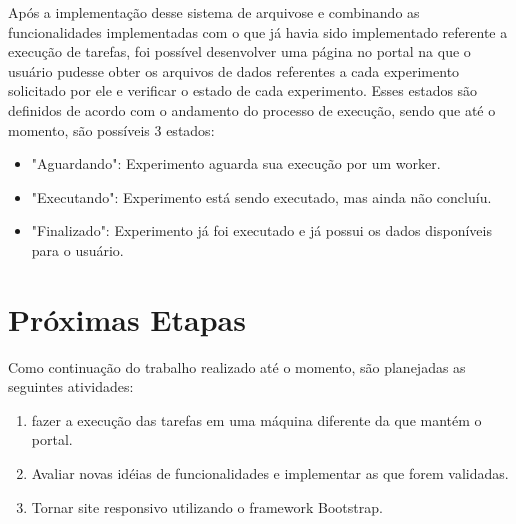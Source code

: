 \documentclass[tg]{mdtufsm}
\begin{document}
Após a implementação desse sistema de arquivose e combinando as funcionalidades implementadas com o que já havia sido implementado referente a execução de tarefas, foi possível desenvolver uma página no portal na que o usuário pudesse obter os arquivos de dados referentes a cada experimento solicitado por ele e verificar o estado de cada experimento. Esses estados são definidos de acordo com o andamento do processo de execução, sendo que até o momento, são possíveis 3 estados: 


\begin{itemize}
	\item "Aguardando": Experimento aguarda sua execução por um worker.
	\item "Executando": Experimento está sendo executado, mas ainda não concluíu.
	\item "Finalizado": Experimento já foi executado e já possui os dados disponíveis para o usuário.
\end{itemize}

\chapter{Próximas Etapas}

Como continuação do trabalho realizado até o momento, são planejadas as seguintes atividades:

\begin{enumerate}
	\item fazer a execução das tarefas em uma máquina diferente da que mantém o portal.
	\item Avaliar novas idéias de funcionalidades e implementar as que forem validadas.
	\item Tornar site responsivo utilizando o framework Bootstrap.
\end{enumerate}

\setlength{\baselineskip}{\baselineskip}


\end{document}
